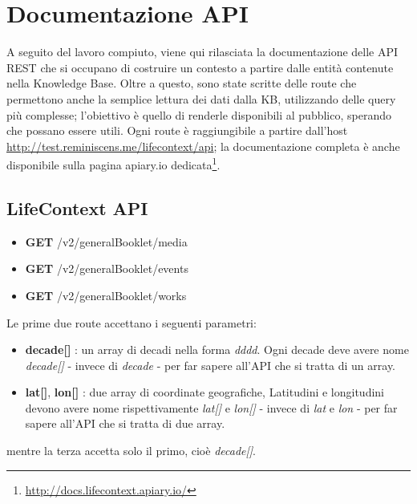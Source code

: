 \documentclass[sigproc-sp.tex]{subfiles}
\begin{document}
\section{Documentazione API}
\label{app:apidocs}
A seguito del lavoro compiuto, viene qui rilasciata la documentazione delle API REST che si occupano di costruire un contesto a partire dalle entità contenute nella Knowledge Base. Oltre a questo, sono state scritte delle route che permettono anche la semplice lettura dei dati dalla KB, utilizzando delle query più complesse; l'obiettivo è quello di renderle disponibili al pubblico, sperando che possano essere utili. Ogni route è raggiungibile a partire dall'host \url{http://test.reminiscens.me/lifecontext/api}; la documentazione completa è anche disponibile sulla pagina apiary.io dedicata\footnote{\url{http://docs.lifecontext.apiary.io/}}.

\subsection{LifeContext API}
\begin{itemize}
\item \textbf{GET} /v2/generalBooklet/media
\item \textbf{GET} /v2/generalBooklet/events
\item \textbf{GET} /v2/generalBooklet/works
\end{itemize}
Le prime due route accettano i seguenti parametri:
\begin{itemize}
\item \textbf{decade[]} : un array di decadi nella forma \textit{dddd}. Ogni decade deve avere nome \textit{decade[]} - invece di \textit{decade} - per far sapere all'API che si tratta di un array.
\item \textbf{lat[]}, \textbf{lon[]} : due array di coordinate geografiche, Latitudini e longitudini devono avere nome rispettivamente \textit{lat[]} e \textit{lon[]} - invece di \textit{lat} e \textit{lon} - per far sapere all'API che si tratta di due array.
\end{itemize}
mentre la terza accetta solo il primo, cioè \textit{decade[]}.
\end{document}
